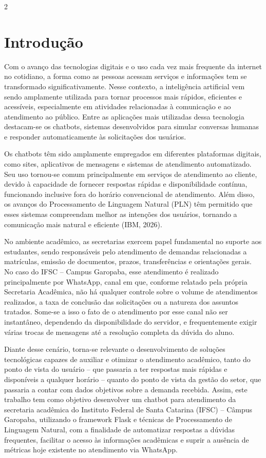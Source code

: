 \documentclass[10pt]{article}
\begin{document}
\begin{multicols}{2}

\section{Introdução}

Com o avanço das tecnologias digitais e o uso cada vez mais frequente da
internet no cotidiano, a forma como as pessoas acessam serviços e
informações tem se transformado significativamente. Nesse contexto, a
inteligência artificial vem sendo amplamente utilizada para tornar
processos mais rápidos, eficientes e acessíveis, especialmente em
atividades relacionadas à comunicação e ao atendimento ao público. Entre
as aplicações mais utilizadas dessa tecnologia destacam-se os chatbots,
sistemas desenvolvidos para simular conversas humanas e responder
automaticamente às solicitações dos usuários.

Os chatbots têm sido amplamente empregados em diferentes plataformas
digitais, como sites, aplicativos de mensagens e sistemas de atendimento
automatizado. Seu uso tornou-se comum principalmente em serviços de
atendimento ao cliente, devido à capacidade de fornecer respostas rápidas
e disponibilidade contínua, funcionando inclusive fora do horário
convencional de atendimento. Além disso, os avanços do Processamento de
Linguagem Natural (PLN) têm permitido que esses sistemas compreendam
melhor as intenções dos usuários, tornando a comunicação mais natural e
eficiente (IBM, 2026).

No ambiente acadêmico, as secretarias exercem papel fundamental no
suporte aos estudantes, sendo responsáveis pelo atendimento de demandas
relacionadas a matrículas, emissão de documentos, prazos, transferências
e orientações gerais. No caso do IFSC -- Campus Garopaba, esse
atendimento é realizado principalmente por WhatsApp, canal em que,
conforme relatado pela própria Secretaria Acadêmica, não há qualquer
controle sobre o volume de atendimentos realizados, a taxa de conclusão
das solicitações ou a natureza dos assuntos tratados. Some-se a isso o
fato de o atendimento por esse canal não ser instantâneo, dependendo da
disponibilidade do servidor, e frequentemente exigir várias trocas de
mensagens até a resolução completa da dúvida do aluno.

Diante desse cenário, torna-se relevante o desenvolvimento de soluções
tecnológicas capazes de auxiliar e otimizar o atendimento acadêmico,
tanto do ponto de vista do usuário -- que passaria a ter respostas mais
rápidas e disponíveis a qualquer horário -- quanto do ponto de vista da
gestão do setor, que passaria a contar com dados objetivos sobre a
demanda recebida. Assim, este trabalho tem como objetivo desenvolver um
chatbot para atendimento da secretaria acadêmica do Instituto Federal de
Santa Catarina (IFSC) -- Câmpus Garopaba, utilizando o framework Flask e
técnicas de Processamento de Linguagem Natural, com a finalidade de
automatizar respostas a dúvidas frequentes, facilitar o acesso às
informações acadêmicas e suprir a ausência de métricas hoje existente no
atendimento via WhatsApp.


\end{multicols}
\end{document}
